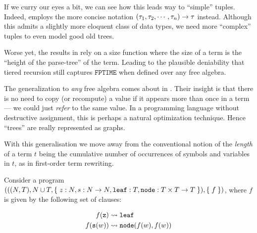 If we curry our eyes a bit, we can see how this leads way to ``simple'' tuples.
Indeed, \cite{marion-2003} employs the more concise notation
${\mathopen{}\left({\tau_1,\tau_2,\cdots,\tau_n}\right)\mathclose{}}\rightarrow \tau$ instead.  Although this
admits a slightly more eloquent class of data types, we need more ``complex''
tuples to even model good old trees.

Worse yet, the results in \cite{leivant-1995} rely on a size function where the
size of a term is the ``height of the parse-tree'' of the term. Leading to the
plausible deniability that tiered recursion still captures $\mathtt{FPTIME}$
when defined over any free algebra\cite{caseiro-1996}.

The generalization to \emph{any} free algebra comes about in
\cite{dal-lago-et-al-2010}. Their insight is that there is no need to copy (or
recompute) a value if it appears more than once in a term --- we could just
\emph{refer} to the same value. In a programming language without destructive
assignment, this is perhaps a natural optimization technique. Hence ``trees''
are really represented as graphs.

\begin{remark} With this generalisation we move away from the conventional
notion of the \emph{length} of a term $t$ being the cumulative number of
occurrences of symbols and variables in $t$, as in first-order term
rewriting\cite{klop-vrijer-2003}. \end{remark}

\begin{example} \cite{dal-lago-et-al-2003} Consider a program ${\mathopen{}\left({{\mathopen{}\left({{\mathopen{}\left({N,T}\right)\mathclose{}}, N
\cup T, \mathopen{}\left\{\mathrel{}{z : N, s : N \rightarrow N, \mathtt{leaf} : T, \mathtt{node} : T
\times T \rightarrow T}\mathrel{}\right\}\mathclose{}}\right)\mathclose{}}, \mathopen{}\left\{\mathrel{}{f}\mathrel{}\right\}\mathclose{}}\right)\mathclose{}}$, where $f$ is given by the following set of
clauses:

\begin{align}
f{\mathopen{}\left({\mathtt{z}}\right)\mathclose{}}       &\leadsto \mathtt{leaf} \\
f{\mathopen{}\left({\mathtt{s}{\mathopen{}\left({w}\right)\mathclose{}}}\right)\mathclose{}}  &\leadsto \mathtt{node}{\mathopen{}\left({f{\mathopen{}\left({w}\right)\mathclose{}}, f{\mathopen{}\left({w}\right)\mathclose{}}}\right)\mathclose{}}
\end{align}

\end{example}
